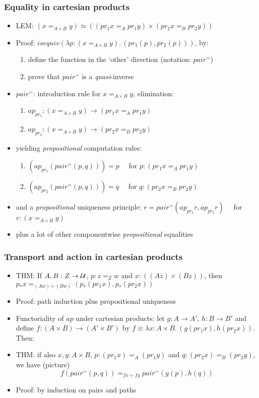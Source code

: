\documentclass[handout]{beamer}
\newcommand{\lamt}[3]{\lambda{#1{:}#2.\,#3}}
\newcommand{\UU}{{\cal U}}
\begin{document}
  \frame
  {

    \frametitle{Equality in cartesian products}

    \begin{itemize}[<+->]
    \item LEM: $(x =_{A\times B} y) \simeq ((pr_1 x =_A pr_1 y) \times (pr_2 x =_B pr_2 y))$
    \item Proof: $isequiv(\lamt{p}{(x =_{A\times B}y)}{(pr_1(p),pr_2(p))})$, by:
      \begin{enumerate}[<+->]
         \item define the function in the `other' direction (notation: $pair^=$)
         \item prove that $pair^=$ is a \emph{quasi}-inverse
       \end{enumerate}
      \item $pair^=$: introduction rule for $x =_{A\times B} y$, elimination:   
      \begin{enumerate}[<+->]
         \item $ap_{pr_1}: (x =_{A\times B} y) \to (pr_1 x =_A pr_1 y)$
         \item $ap_{pr_2}: (x =_{A\times B} y) \to (pr_2 x =_B pr_2 y)$
       \end{enumerate}
    \item yielding \emph{propositional} computation rules:
      \begin{enumerate}[<+->]
      \item $(ap_{pr_1}(pair^=(p,q))) = p\quad$ for $p: (pr_1 x =_A pr_1 y)$
      \item $(ap_{pr_2}(pair^=(p,q))) = q\quad$ for $q: (pr_2 x =_B pr_2 y)$
      \end{enumerate}
    \item and a \emph{propositional} uniqueness principle: 
    $r = pair^=(ap_{pr_1} r, ap_{pr_ 2} r)\quad$ for $r:(x =_{A\times B}y)$
    \item plus a lot of other componentwise \emph{propositional} equalities
    \end{itemize}
  }

  \frame
  {

    \frametitle{Transport and action in cartesian products}

    \begin{itemize}[<+->]
    \item THM: If $A,B:Z\to\UU$,  $p:z=_Z w$ and $x:((A z)\times(B z))$, 
    then $p_* x =_{(A w)\times (B w)}(p_* (pr_1 x), p_* (pr_2 x))$
    \item Proof: path induction plus propositional uniqueness
    \item Functoriality of $ap$ under cartesian products: 
    let $g:A\to A'$, $h:B\to B'$  and define $f: (A{\times}B) \to (A'{\times} B')$
    by $f\equiv\lamt{x}{A{\times}B}{(g(pr_1 x),h(pr_2 x))}$. Then:
    \item THM: if also $x,y:A{\times}B$, $p: (pr_1 x) =_A (pr_1 y)$ and $q: (pr_2 x) =_B (pr_2 y)$, 
    we have (picture) $$f(pair^=(p,q))=_{fx = fy} pair^=(g(p),h(q))$$
    \item Proof: by induction on pairs and paths
    \end{itemize}
  }
\end{document}
